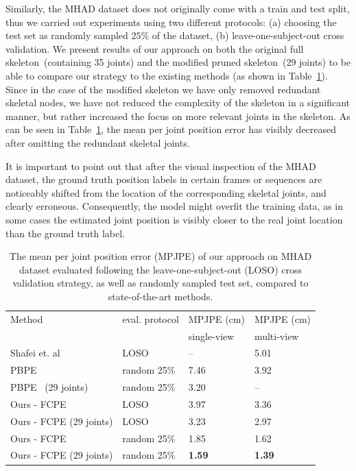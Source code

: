 \noindent
Similarly, the MHAD dataset does not originally come with a train and test split, thus we carried out experiments using two different protocols: (a) choosing the test set as randomly sampled $25 \%$ of the dataset, (b) leave-one-subject-out cross validation. We present results of our approach on both the original full skeleton~(containing 35 joints) and the modified pruned skeleton~(29 joints) to be able to compare our strategy to the existing methods (as shown in Table~\ref{table:mhad_results}). Since in the case of the modified skeleton we have only removed redundant skeletal nodes, we have not reduced the complexity of the skeleton in a significant manner, but rather increased the focus on more relevant joints in the skeleton. As can be seen in Table~\ref{table:mhad_results}, the mean per joint position error has visibly decreased after omitting the redundant skeletal joints.\par
\vspace{5mm}
\noindent It is important to point out that after the visual inspection of the MHAD dataset, the ground truth position labels in certain frames or sequences are noticeably shifted from the location of the corresponding skeletal joints, and clearly erroneous. Consequently, the model might overfit the training data, as in some cases the estimated joint position is visibly closer to the real joint location than the ground truth label.\par
\vspace{5mm}


\setlength{\tabcolsep}{4pt}
\begin{table}[H]
\begin{center}
\caption[Mean per joint position error on MHAD dataset, compared to state-of-the-art methods.]{The mean per joint position error (MPJPE) of our approach on MHAD dataset evaluated following the leave-one-subject-out (LOSO) cross validation strategy, as well as randomly sampled test set, compared to state-of-the-art methods.}
\label{table:mhad_results}
\begin{tabular}{llll}
\hline\noalign{\smallskip}
Method & eval. protocol &MPJPE (cm) & MPJPE (cm) \\
& & single-view & multi-view\\
\noalign{\smallskip}
\hline
\noalign{\smallskip}
Shafei et. al~\cite{Shafaei16}& LOSO & – & 5.01\\ 
PBPE~\cite{Ali19} &random 25\%& 7.46 & 3.92\\
PBPE~\cite{Ali19} (29 joints)&random 25\% & 3.20 & –\\
\hline\noalign{\smallskip}
Ours - FCPE &LOSO& 3.97 &3.36 \\ 
Ours - FCPE  (29 joints)&LOSO& 3.23& 2.97\\ 
Ours - FCPE &random 25\%&  1.85  & 1.62\\ 
Ours - FCPE  (29 joints)&random 25\%& {\bf 1.59}& {\bf 1.39}\\ 
\hline
\end{tabular}
\end{center}
\end{table}
\setlength{\tabcolsep}{1.4pt}


